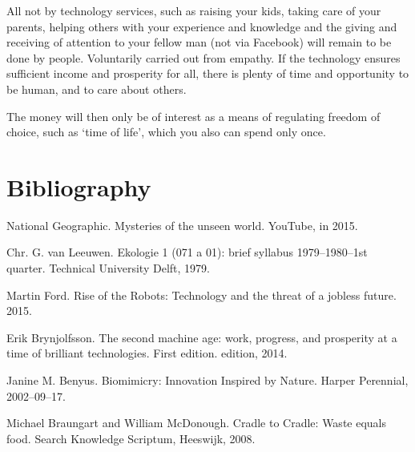 \documentclass[11pt]{article}
\begin{document}
All not by technology services, such as raising your kids, taking care of your parents, helping others with your experience and knowledge and the giving and receiving of attention to your fellow man (not via Facebook) will remain to be done by people. Voluntarily carried out from empathy. If the technology ensures sufficient income and prosperity for all, there is plenty of time and opportunity to be human, and to care about others.

The money will then only be of interest as a means of regulating freedom of choice, such as ‘time of life’, which you also can spend only once.

\section{Bibliography}
\label{sec:orgd9e6ea2}

National Geographic. Mysteries of the unseen world. YouTube, in 2015.

Chr. G. van Leeuwen. Ekologie 1 (071 a 01): brief syllabus 1979–1980–1st quarter. Technical University Delft, 1979.

Martin Ford. Rise of the Robots: Technology and the threat of a jobless future. 2015.

Erik Brynjolfsson. The second machine age: work, progress, and prosperity at a time of brilliant technologies. First edition. edition, 2014.

Janine M. Benyus. Biomimicry: Innovation Inspired by Nature. Harper Perennial, 2002–09–17.

Michael Braungart and William McDonough. Cradle to Cradle: Waste equals food. Search Knowledge Scriptum, Heeswijk, 2008.
\end{document}
